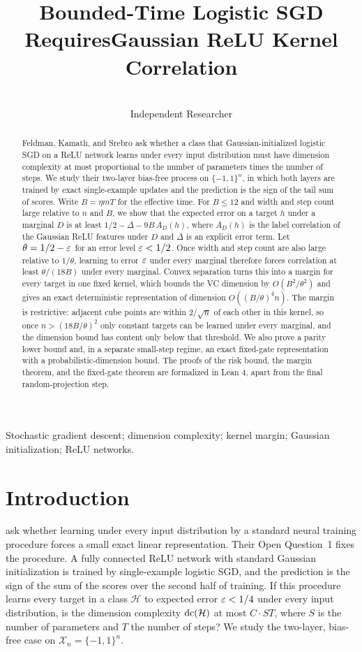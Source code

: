 \documentclass[11pt,letterpaper,pmlr,twoside]{jmlr}
\title[Bounded-time SGD and kernel correlation]{Bounded-Time Logistic SGD Requires\titlebreak Gaussian ReLU Kernel Correlation}
\author[Mausberg]{\Name{Samuel Mausberg}\\\addr Independent Researcher}
\newcommand{\X}{\mathcal X}\newcommand{\Hc}{\mathcal H}
\begin{document}
\maketitle
\begin{abstract}
Feldman, Kamath, and Srebro ask whether a class that Gaussian-initialized logistic SGD on a ReLU network learns under every input distribution must have dimension complexity at most proportional to the number of parameters times the number of steps. We study their two-layer bias-free process on $\{-1,1\}^n$, in which both layers are trained by exact single-example updates and the prediction is the sign of the tail sum of scores. Write $B=\eta mT$ for the effective time. For $B\le12$ and width and step count large relative to $n$ and $B$, we show that the expected error on a target $h$ under a marginal $D$ is at least $1/2-\Delta-9B\,A_D(h)$, where $A_D(h)$ is the label correlation of the Gaussian ReLU features under $D$ and $\Delta$ is an explicit error term. Let $\theta=1/2-\varepsilon$ for an error level $\varepsilon<1/2$. Once width and step count are also large relative to $1/\theta$, learning to error $\varepsilon$ under every marginal therefore forces correlation at least $\theta/(18B)$ under every marginal. Convex separation turns this into a margin for every target in one fixed kernel, which bounds the VC dimension by $O(B^2/\theta^2)$ and gives an exact deterministic representation of dimension $O((B/\theta)^4n)$. The margin is restrictive: adjacent cube points are within $2/\sqrt n$ of each other in this kernel, so once $n>(18B/\theta)^2$ only constant targets can be learned under every marginal, and the dimension bound has content only below that threshold. We also prove a parity lower bound and, in a separate small-step regime, an exact fixed-gate representation with a probabilistic-dimension bound. The proofs of the risk bound, the margin theorem, and the fixed-gate theorem are formalized in Lean 4, apart from the final random-projection step.
\end{abstract}
\begin{keywords}
Stochastic gradient descent; dimension complexity; kernel margin; Gaussian initialization; ReLU networks.
\end{keywords}

\section{Introduction}
\citet{FKS26} ask whether learning under every input distribution by a standard neural training procedure forces a small exact linear representation. Their Open Question~1 fixes the procedure. A fully connected ReLU network with standard Gaussian initialization is trained by single-example logistic SGD, and the prediction is the sign of the sum of the scores over the second half of training. If this procedure learns every target in a class $\Hc$ to expected error $\varepsilon<1/4$ under every input distribution, is the dimension complexity $\dc(\Hc)$ at most $C\cdot ST$, where $S$ is the number of parameters and $T$ the number of steps? We study the two-layer, bias-free case on $\X_n=\{-1,1\}^n$.
\end{document}
